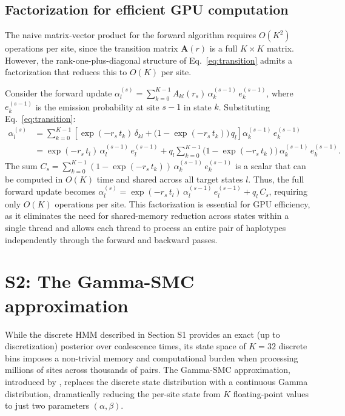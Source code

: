 \documentclass[10pt,letterpaper]{article}
\begin{document}
\subsection{Factorization for efficient GPU computation}

The naive matrix-vector product for the forward algorithm requires $O(K^2)$ operations per site, since the transition matrix $\mathbf{A}(r)$ is a full $K \times K$ matrix. However, the rank-one-plus-diagonal structure of Eq.~\eqref{eq:transition} admits a factorization that reduces this to $O(K)$ per site.

Consider the forward update $\alpha_l^{(s)} = \sum_{k=0}^{K-1} A_{kl}(r_s)\, \alpha_k^{(s-1)}\, e_k^{(s-1)}$, where $e_k^{(s-1)}$ is the emission probability at site $s-1$ in state $k$. Substituting Eq.~\eqref{eq:transition}:
\begin{align}
\alpha_l^{(s)} &= \sum_{k=0}^{K-1} \left[\exp(-r_s\, t_k)\, \delta_{kl} + \bigl(1 - \exp(-r_s\, t_k)\bigr)\, q_l\right] \alpha_k^{(s-1)}\, e_k^{(s-1)} \nonumber \\
&= \exp(-r_s\, t_l)\, \alpha_l^{(s-1)}\, e_l^{(s-1)} + q_l \sum_{k=0}^{K-1} \bigl(1 - \exp(-r_s\, t_k)\bigr)\, \alpha_k^{(s-1)}\, e_k^{(s-1)}.
\label{eq:forward_factored}
\end{align}
The sum $C_s = \sum_{k=0}^{K-1} (1 - \exp(-r_s\, t_k))\, \alpha_k^{(s-1)}\, e_k^{(s-1)}$ is a scalar that can be computed in $O(K)$ time and shared across all target states $l$. Thus, the full forward update becomes $\alpha_l^{(s)} = \exp(-r_s\, t_l)\, \alpha_l^{(s-1)}\, e_l^{(s-1)} + q_l\, C_s$, requiring only $O(K)$ operations per site. This factorization is essential for GPU efficiency, as it eliminates the need for shared-memory reduction across states within a single thread and allows each thread to process an entire pair of haplotypes independently through the forward and backward passes.


\section{S2: The Gamma-SMC approximation}

While the discrete HMM described in Section S1 provides an exact (up to discretization) posterior over coalescence times, its state space of $K = 32$ discrete bins imposes a non-trivial memory and computational burden when processing millions of sites across thousands of pairs. The Gamma-SMC approximation, introduced by \citet{Schweiger2023}, replaces the discrete state distribution with a continuous Gamma distribution, dramatically reducing the per-site state from $K$ floating-point values to just two parameters $(\alpha, \beta)$.
\end{document}
